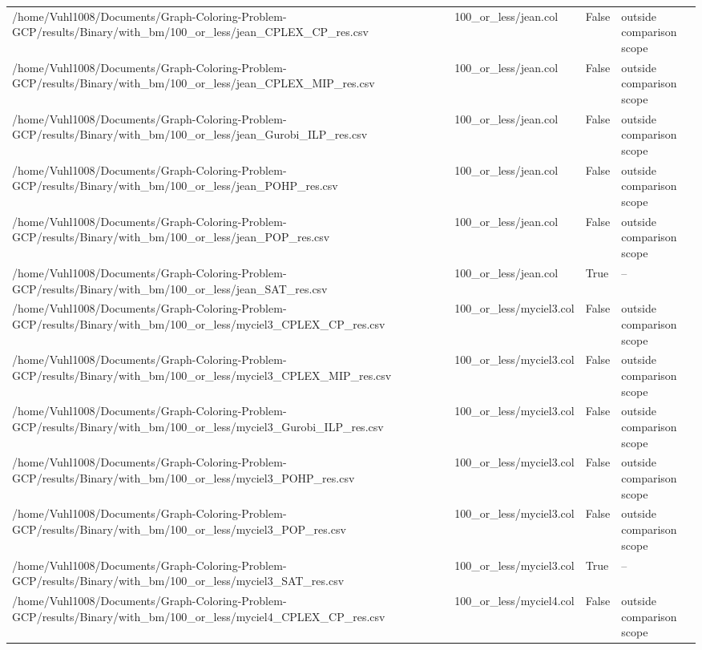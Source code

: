 \begin{table}[htbp]
\begin{tabular}{llll}
/home/Vuhl1008/Documents/Graph-Coloring-Problem-GCP/results/Binary/with\_bm/100\_or\_less/jean\_CPLEX\_CP\_res.csv & 100\_or\_less/jean.col & False & outside comparison scope \\
/home/Vuhl1008/Documents/Graph-Coloring-Problem-GCP/results/Binary/with\_bm/100\_or\_less/jean\_CPLEX\_MIP\_res.csv & 100\_or\_less/jean.col & False & outside comparison scope \\
/home/Vuhl1008/Documents/Graph-Coloring-Problem-GCP/results/Binary/with\_bm/100\_or\_less/jean\_Gurobi\_ILP\_res.csv & 100\_or\_less/jean.col & False & outside comparison scope \\
/home/Vuhl1008/Documents/Graph-Coloring-Problem-GCP/results/Binary/with\_bm/100\_or\_less/jean\_POHP\_res.csv & 100\_or\_less/jean.col & False & outside comparison scope \\
/home/Vuhl1008/Documents/Graph-Coloring-Problem-GCP/results/Binary/with\_bm/100\_or\_less/jean\_POP\_res.csv & 100\_or\_less/jean.col & False & outside comparison scope \\
/home/Vuhl1008/Documents/Graph-Coloring-Problem-GCP/results/Binary/with\_bm/100\_or\_less/jean\_SAT\_res.csv & 100\_or\_less/jean.col & True & -- \\
/home/Vuhl1008/Documents/Graph-Coloring-Problem-GCP/results/Binary/with\_bm/100\_or\_less/myciel3\_CPLEX\_CP\_res.csv & 100\_or\_less/myciel3.col & False & outside comparison scope \\
/home/Vuhl1008/Documents/Graph-Coloring-Problem-GCP/results/Binary/with\_bm/100\_or\_less/myciel3\_CPLEX\_MIP\_res.csv & 100\_or\_less/myciel3.col & False & outside comparison scope \\
/home/Vuhl1008/Documents/Graph-Coloring-Problem-GCP/results/Binary/with\_bm/100\_or\_less/myciel3\_Gurobi\_ILP\_res.csv & 100\_or\_less/myciel3.col & False & outside comparison scope \\
/home/Vuhl1008/Documents/Graph-Coloring-Problem-GCP/results/Binary/with\_bm/100\_or\_less/myciel3\_POHP\_res.csv & 100\_or\_less/myciel3.col & False & outside comparison scope \\
/home/Vuhl1008/Documents/Graph-Coloring-Problem-GCP/results/Binary/with\_bm/100\_or\_less/myciel3\_POP\_res.csv & 100\_or\_less/myciel3.col & False & outside comparison scope \\
/home/Vuhl1008/Documents/Graph-Coloring-Problem-GCP/results/Binary/with\_bm/100\_or\_less/myciel3\_SAT\_res.csv & 100\_or\_less/myciel3.col & True & -- \\
/home/Vuhl1008/Documents/Graph-Coloring-Problem-GCP/results/Binary/with\_bm/100\_or\_less/myciel4\_CPLEX\_CP\_res.csv & 100\_or\_less/myciel4.col & False & outside comparison scope \\

\end{tabular}
\end{table}
